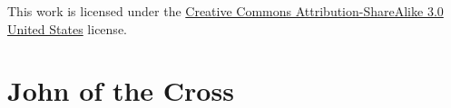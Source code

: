 

\frontmatter
\thispagestyle{empty}
\vspace*{\fill}
\clearpage

\thispagestyle{empty}
\vspace*{\fill}
\begin{center}
	{\footnotesize\noindent This work is licensed under the \href{http://creativecommons.org/licenses/by-sa/3.0/us/}{Creative Commons Attribution-ShareAlike 3.0 United States} license.}\bigskip
\end{center}
\vspace*{2in}

\mainmatter
\chapter{John of the Cross}
	

